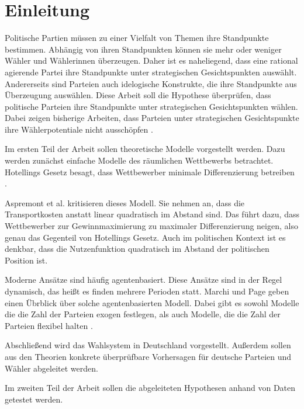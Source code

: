 
\chapter{Einleitung}\label{Kap-Einleitung}
Politische Partien müssen zu einer Vielfalt von Themen ihre Standpunkte bestimmen. Abhängig von ihren Standpunkten können sie mehr oder weniger Wähler und Wählerinnen überzeugen. Daher ist es naheliegend, dass eine rational agierende Partei ihre Standpunkte unter strategischen Gesichtspunkten auswählt. Andererseits sind Parteien auch idelogische Konstrukte, die ihre Standpunkte aus Überzeugung auswählen. Diese Arbeit soll die Hypothese überprüfen, dass politische Parteien ihre Standpunkte unter strategischen Gesichtspunkten wählen. Dabei zeigen bisherige Arbeiten, dass Parteien unter strategischen Gesichtspunkte ihre Wählerpotentiale nicht ausschöpfen \citep{schofield1998germany}.

Im ersten Teil der Arbeit sollen theoretische Modelle vorgestellt werden. Dazu werden  zunächst einfache Modelle des räumlichen Wettbewerbs betrachtet. Hotellings Gesetz besagt, dass Wettbewerber minimale Differenzierung betreiben \citep{hotelling1929}.

Aspremont et al. \citep{aspremont1979} kritisieren dieses Modell. Sie nehmen an, dass die Transportkosten anstatt linear quadratisch im Abstand sind. Das führt dazu, dass Wettbewerber zur Gewinnmaximierung zu maximaler Differenzierung neigen, also genau das Gegenteil von Hotellings Gesetz. Auch im politischen Kontext ist es denkbar, dass die Nutzenfunktion quadratisch im Abstand der politischen Position ist.

Moderne Ansätze sind häufig agentenbasiert. Diese Ansätze sind in der Regel dynamisch, das heißt es finden mehrere Perioden statt. Marchi und Page \citep{marchi2014ABMs} geben einen Übrblick über solche agentenbasierten Modell. Dabei gibt es sowohl Modelle die die Zahl der Parteien exogen festlegen, als auch Modelle, die die Zahl der Parteien flexibel halten \citep{laver2007endogenousParties}.

Abschließend wird das Wahlsystem in Deutschland vorgestellt. Außerdem sollen aus den Theorien konkrete überprüfbare Vorhersagen für deutsche Parteien und Wähler abgeleitet werden.

Im zweiten Teil der Arbeit sollen die abgeleiteten Hypothesen anhand von Daten getestet werden. 

